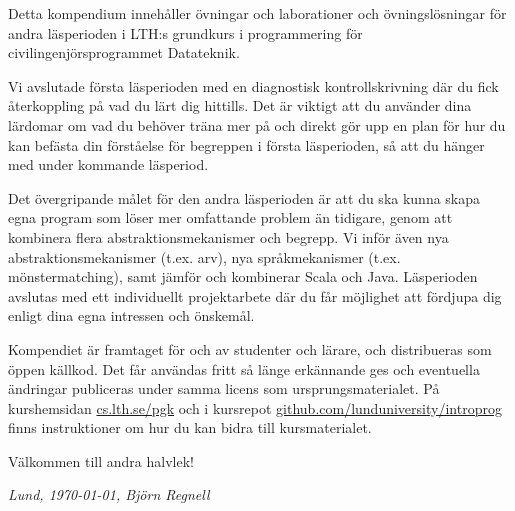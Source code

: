 


Detta kompendium innehåller övningar och laborationer och övningslösningar för andra läsperioden i LTH:s grundkurs i programmering för civilingenjörsprogrammet Datateknik.


Vi avslutade första läsperioden med en diagnostisk kontrollskrivning där du fick återkoppling på vad du lärt dig hittills. Det är viktigt att du använder dina lärdomar om vad du behöver träna mer på och direkt gör upp en plan för hur du kan befästa din förståelse för begreppen i första läsperioden, så att du hänger med under kommande läsperiod.

Det övergripande målet för den andra läsperioden är att du ska kunna skapa egna program som löser mer omfattande problem än tidigare, genom att kombinera flera abstraktionsmekanismer och begrepp. Vi inför även nya abstraktionsmekanismer (t.ex. arv), nya språkmekanismer (t.ex. mönstermatching), samt jämför och kombinerar Scala och Java. Läsperioden avslutas med ett individuellt projektarbete där du får möjlighet att fördjupa dig enligt dina egna intressen och önskemål.

Kompendiet är framtaget för och av studenter och lärare, och distribueras som öppen källkod. Det får användas fritt så länge erkännande ges och eventuella ändringar publiceras under samma licens som ursprungsmaterialet. På kurshemsidan \href{http://cs.lth.se/pgk}{cs.lth.se/pgk} och i kursrepot \href{http://github.com/lunduniversity/introprog}{github.com/lunduniversity/introprog} finns instruktioner om hur du kan bidra till kursmaterialet.

Välkommen till andra halvlek!

\vspace{1em}\noindent \textit{\hfill Lund, \today, Björn Regnell}
